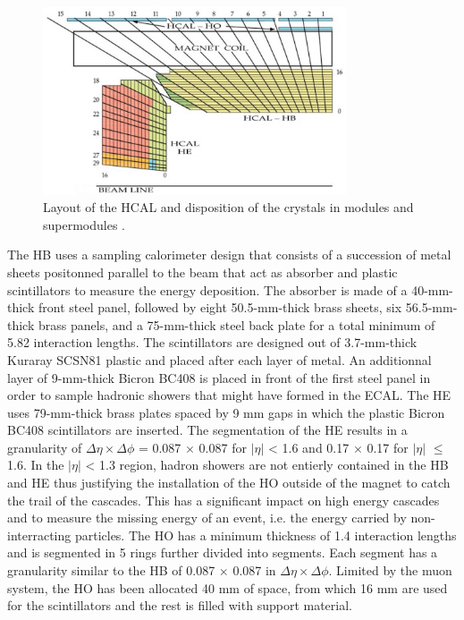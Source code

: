     \begin{figure}[h!]
      \centering
      \includegraphics[width=0.8\textwidth]{img/I-3-cms/hcal.png}
      \caption{Layout of the HCAL and disposition of the crystals in modules and supermodules \cite{1748-0221-3-08-S08004}.}
      \label{fig:I-3-hcal}
    \end{figure}

    The HB uses a sampling calorimeter design that consists of a succession of metal sheets positonned parallel to the beam that act as absorber and plastic scintillators to measure the energy deposition. The absorber is made of a 40-mm-thick front steel panel, followed by eight 50.5-mm-thick brass sheets, six 56.5-mm-thick brass panels, and a 75-mm-thick steel back plate for a total minimum of 5.82 interaction lengths. The scintillators are designed out of 3.7-mm-thick Kuraray SCSN81 plastic and placed after each layer of metal. An additionnal layer of 9-mm-thick Bicron BC408 is placed in front of the first steel panel in order to sample hadronic showers that might have formed in the ECAL. The HE uses 79-mm-thick brass plates spaced by 9 mm gaps in which the plastic Bicron BC408 scintillators are inserted. The segmentation of the HE results in a granularity of $ \Delta \eta \times \Delta \phi $ = 0.087 $ \times $ 0.087 for $ | \eta | $ < 1.6 and 0.17 $ \times $ 0.17 for $ | \eta | $ $ \le $ 1.6. In the $ | \eta | $ < 1.3 region, hadron showers are not entierly contained in the HB and HE thus justifying the installation of the HO outside of the magnet to catch the trail of the cascades. This has a significant impact on high energy cascades and to measure the missing energy of an event, i.e. the energy carried by non-interracting particles. The HO has a minimum thickness of 1.4 interaction lengths and is segmented in 5 rings further divided into segments. Each segment has a granularity similar to the HB of 0.087 $ \times $ 0.087 in $ \Delta \eta \times \Delta \phi $. Limited by the muon system, the HO has been allocated 40 mm of space, from which 16 mm are used for the scintillators and the rest is filled with support material. \\

